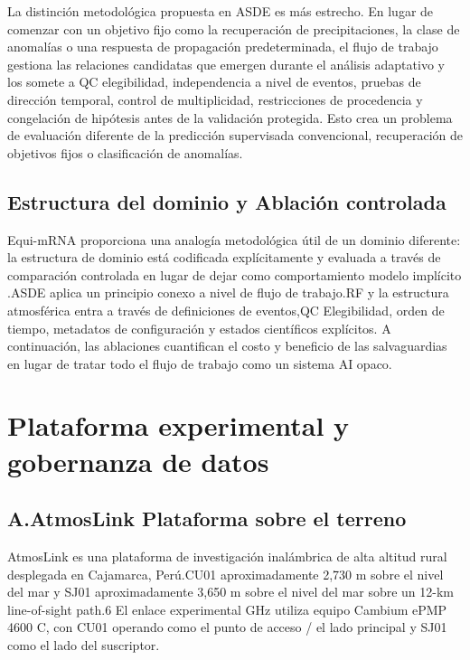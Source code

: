 \documentclass{ieeeaccess}
\begin{document}
La distinción metodológica propuesta en ASDE es más estrecho. En lugar de comenzar con un objetivo fijo como la recuperación de precipitaciones, la clase de anomalías o una respuesta de propagación predeterminada, el flujo de trabajo gestiona las relaciones candidatas que emergen durante el análisis adaptativo y los somete a QC elegibilidad, independencia a nivel de eventos, pruebas de dirección temporal, control de multiplicidad, restricciones de procedencia y congelación de hipótesis antes de la validación protegida. Esto crea un problema de evaluación diferente de la predicción supervisada convencional, recuperación de objetivos fijos o clasificación de anomalías.

\subsection{Estructura del dominio y Ablación controlada}\label{estructura-del-dominio-y-ablaciuxf3n-controlada}

Equi-mRNA proporciona una analogía metodológica útil de un dominio diferente: la estructura de dominio está codificada explícitamente y evaluada a través de comparación controlada en lugar de dejar como comportamiento modelo implícito \cite{EQUI-MRNA-2025}.ASDE aplica un principio conexo a nivel de flujo de trabajo.RF y la estructura atmosférica entra a través de definiciones de eventos,QC Elegibilidad, orden de tiempo, metadatos de configuración y estados científicos explícitos. A continuación, las ablaciones cuantifican el costo y beneficio de las salvaguardias en lugar de tratar todo el flujo de trabajo como un sistema AI opaco.

\section{Plataforma experimental y gobernanza de datos}\label{plataforma-experimental-y-gobernanza-de-datos}

\subsection{A.AtmosLink Plataforma sobre el terreno}\label{a.atmoslink-plataforma-sobre-el-terreno}

AtmosLink es una plataforma de investigación inalámbrica de alta altitud rural desplegada en Cajamarca, Perú.CU01 aproximadamente 2,730 m sobre el nivel del mar y SJ01 aproximadamente 3,650 m sobre el nivel del mar sobre un 12-km line-of-sight path.6 El enlace experimental GHz utiliza equipo Cambium ePMP 4600 C, con CU01 operando como el punto de acceso / el lado principal y SJ01 como el lado del suscriptor.
\end{document}
